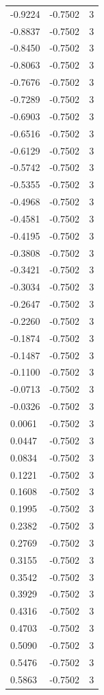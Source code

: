 \begin{longtable}{lrr}
  -0.9224 & -0.7502 & 3 \\
  -0.8837 & -0.7502 & 3 \\
  -0.8450 & -0.7502 & 3 \\
  -0.8063 & -0.7502 & 3 \\
  -0.7676 & -0.7502 & 3 \\
  -0.7289 & -0.7502 & 3 \\
  -0.6903 & -0.7502 & 3 \\
  -0.6516 & -0.7502 & 3 \\
  -0.6129 & -0.7502 & 3 \\
  -0.5742 & -0.7502 & 3 \\
  -0.5355 & -0.7502 & 3 \\
  -0.4968 & -0.7502 & 3 \\
  -0.4581 & -0.7502 & 3 \\
  -0.4195 & -0.7502 & 3 \\
  -0.3808 & -0.7502 & 3 \\
  -0.3421 & -0.7502 & 3 \\
  -0.3034 & -0.7502 & 3 \\
  -0.2647 & -0.7502 & 3 \\
  -0.2260 & -0.7502 & 3 \\
  -0.1874 & -0.7502 & 3 \\
  -0.1487 & -0.7502 & 3 \\
  -0.1100 & -0.7502 & 3 \\
  -0.0713 & -0.7502 & 3 \\
  -0.0326 & -0.7502 & 3 \\
  0.0061 & -0.7502 & 3 \\
  0.0447 & -0.7502 & 3 \\
  0.0834 & -0.7502 & 3 \\
  0.1221 & -0.7502 & 3 \\
  0.1608 & -0.7502 & 3 \\
  0.1995 & -0.7502 & 3 \\
  0.2382 & -0.7502 & 3 \\
  0.2769 & -0.7502 & 3 \\
  0.3155 & -0.7502 & 3 \\
  0.3542 & -0.7502 & 3 \\
  0.3929 & -0.7502 & 3 \\
  0.4316 & -0.7502 & 3 \\
  0.4703 & -0.7502 & 3 \\
  0.5090 & -0.7502 & 3 \\
  0.5476 & -0.7502 & 3 \\
  0.5863 & -0.7502 & 3 \\

\end{longtable}
